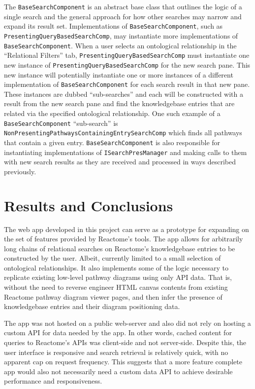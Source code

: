 \documentclass[12pt]{report}
\begin{document}
The \verb|BaseSearchComponent| is an abstract base class that outlines the logic of a single search and the general approach for how other searches may narrow and expand its result set. Implementations of \verb|BaseSearchComponent|, such as \verb|PresentingQueryBasedSearchComp|, may instantiate more implementations of \verb|BaseSearchComponent|. When a user selects an ontological relationship in the ``Relational Filters'' tab, \verb|PresentingQueryBasedSearchComp| must instantiate one new instance of \verb|PresentingQueryBasedSearchComp| for the new search pane. This new instance will potentially instantiate one or more instances of a different implementation of \verb|BaseSearchComponent| for each search result in that new pane. These instances are dubbed ``sub-searches'' and each will be constructed with a result from the new search pane and find the knowledgebase entries that are related via the specified ontological relationship. One such example of a \verb|BaseSearchComponent| ``sub-search'' is \verb|NonPresentingPathwaysContainingEntrySearchComp| which finds all pathways that contain a given entry. \verb|BaseSearchComponent| is also responsible for instantiating implementations of \verb|ISearchPresManager| and making calls to them with new search results as they are received and processed in ways described previously.

\chapter{Results and Conclusions}
The web app developed in this project can serve as a prototype for expanding on the set of features provided by Reactome's tools. The app allows for arbitrarily long chains of relational searches on Reactome's knowledgebase entries to be constructed by the user. Albeit, currently limited to a small selection of ontological relationships. It also implements some of the logic necessary to replicate existing low-level pathway diagrams using only API data. That is, without the need to reverse engineer HTML canvas contents from existing Reactome pathway diagram viewer pages, and then infer the presence of knowledgebase entries and their diagram positioning data.

The app was not hosted on a public web-server and also did not rely on hosting a custom API for data needed by the app. In other words, cached content for queries to Reactome's APIs was client-side and not server-side. Despite this, the user interface is responsive and search retrieval is relatively quick, with no apparent cap on request frequency. This suggests that a more feature complete app would also not necessarily need a custom data API to achieve desirable performance and responsiveness.
\end{document}

